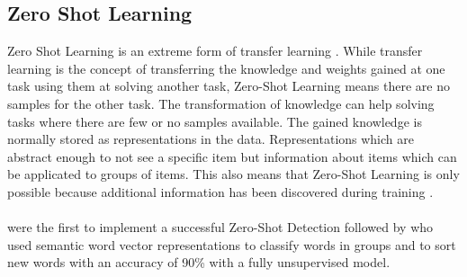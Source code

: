 \subsection{Zero Shot Learning}
Zero Shot Learning is an extreme form of transfer learning \cite[S. 536]{goodfellow_deep_2016}. While transfer learning is the concept of transferring the knowledge and weights gained at one task using them at solving another task, Zero-Shot Learning means there are no samples for the other task. The transformation of knowledge can help solving tasks where there are few or no samples available. The gained knowledge is normally stored as representations in the data. Representations which are abstract enough to not see a specific item but information about items which can be applicated to groups of items. This also means that Zero-Shot Learning is only possible because additional information has been discovered during training \cite[S. 536]{goodfellow_deep_2016}. \\\\
 were the first to implement a successful Zero-Shot Detection followed by  who used semantic word vector representations to classify words in groups and to sort new words with an accuracy of 90\% with a fully unsupervised model.

